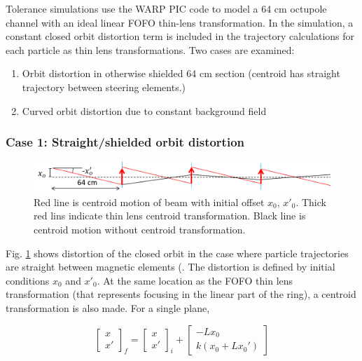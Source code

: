 Tolerance simulations use the WARP PIC code to model a 64 cm octupole channel with an ideal linear FOFO thin-lens transformation. In the simulation, a constant closed orbit distortion term is included in the trajectory calculations for each particle as thin lens transformations. Two cases are examined:

\begin{enumerate}
\item Orbit distortion in otherwise shielded 64 cm section (centroid has straight trajectory between steering elements.)
\item Curved orbit distortion due to constant background field
\end{enumerate}

\subsubsection{Case 1: Straight/shielded orbit distortion}

\begin{figure}
\centering
\includegraphics[width=\textwidth]{7.figures/steeringtolerance/orbit_distortion_cartoon.png}
\caption{Red line is centroid motion of beam with initial offset $x_0$, $x'_0$. Thick red lins indicate thin lens centroid transformation. Black line is centroid motion without centroid transformation.}
\label{fig:straightorbitdistortion}
\end{figure}

Fig. \ref{fig:straightorbitdistortion} shows distortion of the closed orbit in the case where particle trajectories are straight between magnetic elements (. The distortion is defined by initial conditions $x_0$ and $x'_0$. At the same location as the FOFO thin lens transformation (that represents focusing in the linear part of the ring), a centroid transformation is also made. For a single plane,

\begin{equation}
\begin{bmatrix} x \\ x' \end{bmatrix}_f = \begin{bmatrix} x \\ x' \end{bmatrix}_i + \begin{bmatrix} -L x_0 \\ k(x_0 + Lx_0') \end{bmatrix}
\label{eq:straightorbitdistortion}
\end{equation}

